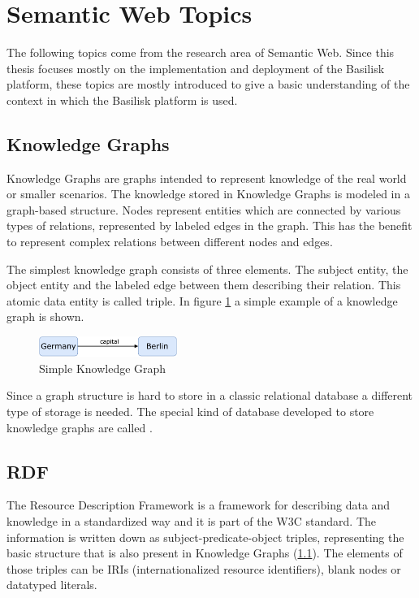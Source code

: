 \section{Semantic Web Topics}
The following topics come from the research area of Semantic Web.
Since this thesis focuses mostly on the implementation and deployment of the Basilisk platform, these topics are mostly introduced to give a basic understanding of the context in which the Basilisk platform is used.

\subsection{Knowledge Graphs} 
\label{sec:knowledge_graphs}
Knowledge Graphs are graphs intended to represent knowledge of the real world or smaller scenarios.
The knowledge stored in Knowledge Graphs is modeled in a graph-based structure. 
Nodes represent entities which are connected by various types of relations, represented by labeled edges in the graph.
This has the benefit to represent complex relations between different nodes and edges\cite{hoganKnowledgeGraphs2021}.

The simplest knowledge graph consists of three elements.
The subject entity, the object entity and the labeled edge between them describing their relation.
This atomic data entity is called triple.
In figure \ref{fig:example-knowledge-graph} a simple example of a knowledge graph is shown.

\begin{figure}[tbph]
	\centering
	\includegraphics[width=0.4\textwidth]{figures/knowledge-graph-diagram}
	\caption{Simple Knowledge Graph}
	\label{fig:example-knowledge-graph}
\end{figure}

Since a graph structure is hard to store in a classic relational database a different type of storage is needed.
The special kind of database developed to store knowledge graphs are called \tsp{}.


\subsection{RDF}
\label{sec:rdf}
The Resource Description Framework is a framework for describing data and knowledge in a standardized way \cite{RDFConceptsAbstract} and it is part of the W3C standard.
The information is written down as subject-predicate-object triples, representing the basic structure that is also present in Knowledge Graphs (\ref{sec:knowledge_graphs}).
The elements of those triples can be IRIs (internationalized resource identifiers), blank nodes or datatyped literals.

